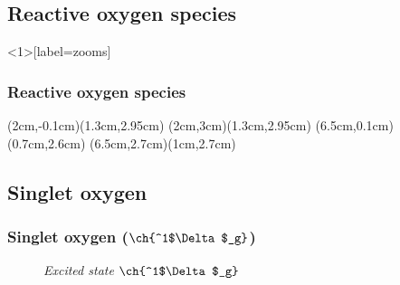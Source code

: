 \documentclass[aspectratio=169,fleqn,table]{beamer}
\begin{document}

\subsection{Reactive oxygen species}
\begin{frame}<1>[label=zooms]
\frametitle<1>{Reactive oxygen species}
    
(2cm,-0.1cm)(1.3cm,2.95cm)
(2cm,3cm)(1.3cm,2.95cm)
(6.5cm,0.1cm)(0.7cm,2.6cm)
(6.5cm,2.7cm)(1cm,2.7cm)
\begin{center}
    \vspace{-14pt}
    \vspace{-10pt}
\end{center}
    
\end{frame}


\subsection{Singlet oxygen}

\begingroup
{}
\begin{frame}
\frametitle{Singlet oxygen ($\ch{^1$\Delta$_g}$)}

\begin{figure}\centering
\begin{minipage}[b]{0.46\textwidth}
	\centering
	\vspace{-10pt}
    \vspace{-5pt}
	\caption{%
    \textit{Groundstate $\ch{^3$\Sigma${{_g}{^-}}}$}}
\end{minipage}
\hfill
\begin{minipage}[b]{0.46\textwidth}
	\centering
	\vspace{-10pt}
    \vspace{-5pt}
	\caption{%
    \textit{Excited state  $\ch{^1$\Delta$_g}$}}
\end{minipage}
\end{figure}

\end{frame}
\endgroup
\end{document}
